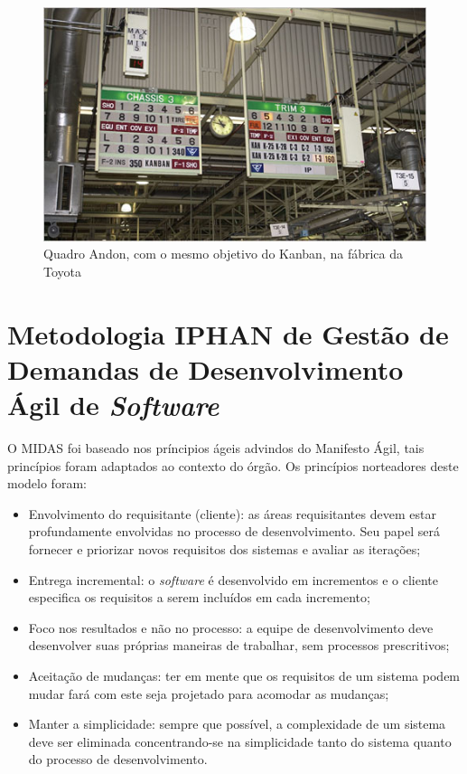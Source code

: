 \begin{anexosenv}
\begin{figure}[H]
		\centering
		\label{fig04}
			\includegraphics[scale=1.0]{figuras/kanbanindustria.png}
		\caption{Quadro Andon, com o mesmo objetivo do Kanban, na fábrica da Toyota \cite{kanbanindustria}}
\end{figure}

\chapter{Metodologia IPHAN de Gestão de Demandas de Desenvolvimento Ágil de \textit{Software}}

O MIDAS foi baseado nos príncipios ágeis advindos do Manifesto Ágil, tais princípios foram adaptados ao contexto do órgão. Os princípios norteadores deste modelo foram:
\begin{itemize}
\item Envolvimento do requisitante (cliente): as áreas requisitantes devem estar profundamente envolvidas no processo de desenvolvimento. Seu papel será fornecer e priorizar novos requisitos dos sistemas e avaliar as iterações;
\item Entrega incremental: o \textit{software} é desenvolvido em incrementos e o cliente especifica os requisitos a serem incluídos em cada incremento;
\item Foco nos resultados e não no processo: a equipe de desenvolvimento deve desenvolver suas próprias maneiras de trabalhar, sem processos prescritivos;
\item Aceitação de mudanças: ter em mente que os requisitos de um sistema podem mudar fará com este seja projetado para acomodar as mudanças;
\item Manter a simplicidade: sempre que possível, a complexidade de um sistema deve ser eliminada concentrando-se na simplicidade tanto do sistema quanto do processo de desenvolvimento.
\end{itemize}


\end{anexosenv}
